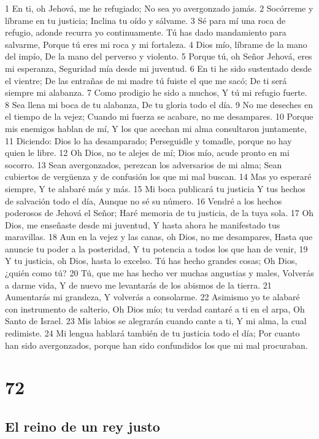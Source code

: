 1 En ti, oh Jehová, me he refugiado;
No sea yo avergonzado jamás.
2 Socórreme y líbrame en tu justicia;
Inclina tu oído y sálvame.
3 Sé para mí una roca de refugio, adonde recurra yo continuamente.
Tú has dado mandamiento para salvarme,
Porque tú eres mi roca y mi fortaleza.
4 Dios mío, líbrame de la mano del impío,
De la mano del perverso y violento.
5 Porque tú, oh Señor Jehová, eres mi esperanza,
Seguridad mía desde mi juventud.
6 En ti he sido sustentado desde el vientre;
De las entrañas de mi madre tú fuiste el que me sacó;
De ti será siempre mi alabanza.
7 Como prodigio he sido a muchos,
Y tú mi refugio fuerte.
8 Sea llena mi boca de tu alabanza,
De tu gloria todo el día.
9 No me deseches en el tiempo de la vejez;
Cuando mi fuerza se acabare, no me desampares.
10 Porque mis enemigos hablan de mí,
Y los que acechan mi alma consultaron juntamente,
11 Diciendo: Dios lo ha desamparado;
Perseguidle y tomadle, porque no hay quien le libre.
12 Oh Dios, no te alejes de mí;
Dios mío, acude pronto en mi socorro.
13 Sean avergonzados, perezcan los adversarios de mi alma;
Sean cubiertos de vergüenza y de confusión los que mi mal buscan.
14 Mas yo esperaré siempre,
Y te alabaré más y más.
15 Mi boca publicará tu justicia
Y tus hechos de salvación todo el día,
Aunque no sé su número.
16 Vendré a los hechos poderosos de Jehová el Señor;
Haré memoria de tu justicia, de la tuya sola.
17 Oh Dios, me enseñaste desde mi juventud,
Y hasta ahora he manifestado tus maravillas.
18 Aun en la vejez y las canas, oh Dios, no me desampares,
Hasta que anuncie tu poder a la posteridad,
Y tu potencia a todos los que han de venir,
19 Y tu justicia, oh Dios, hasta lo excelso.
Tú has hecho grandes cosas;
Oh Dios, ¿quién como tú?
20 Tú, que me has hecho ver muchas angustias y males,
Volverás a darme vida,
Y de nuevo me levantarás de los abismos de la tierra.
21 Aumentarás mi grandeza,
Y volverás a consolarme.
22 Asimismo yo te alabaré con instrumento de salterio,
Oh Dios mío; tu verdad cantaré a ti en el arpa,
Oh Santo de Israel.
23 Mis labios se alegrarán cuando cante a ti,
Y mi alma, la cual redimiste.
24 Mi lengua hablará también de tu justicia todo el día;
Por cuanto han sido avergonzados, porque han sido confundidos los que mi mal procuraban.

\chapter{72}

\section*{El reino de un rey justo}

